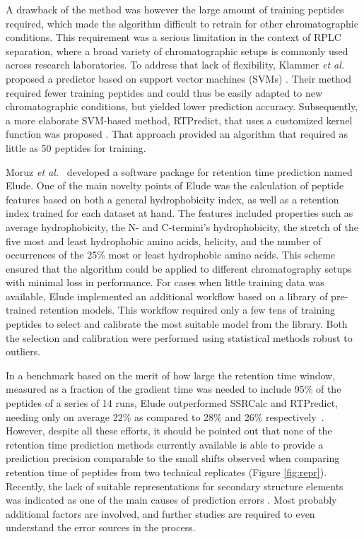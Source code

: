 \documentclass[a4paper]{article}
\begin{document}
A drawback of the method was however the large amount of training
peptides required, which made the algorithm difficult to retrain for
other chromatographic conditions. This requirement was a serious
limitation in the context of RPLC separation, where a broad variety of
chromatographic setups is commonly used across research
laboratories. To address that lack of flexibility, Klammer {\em et
  al.} proposed a predictor based on support vector machines (SVMs)
\cite{klammer2007improving}. Their method required fewer training
peptides and could thus be easily adapted to new chromatographic
conditions, but yielded lower prediction accuracy.  Subsequently, a
more elaborate SVM-based method, {\sc RTPredict}, that uses a
customized kernel function was proposed \cite{rtpredict,
  rtpredictImproved}. That approach provided an algorithm that
required as little as 50 peptides for training.


Moruz {\em et al.}~\cite{elude1} developed a software package for
retention time prediction named {\sc Elude}. One of the main novelty
points of {\sc Elude} was the calculation of peptide features based on
both a general hydrophobicity index, as well as a retention index
trained for each dataset at hand. The features included properties
such as average hydrophobicity, the N- and C-termini's hydrophobicity,
the stretch of the five most and least hydrophobic amino acids,
helicity, and the number of occurrences of the 25\% most or least
hydrophobic amino acids. This scheme ensured that the algorithm could
be applied to different chromatography setups with minimal loss in
performance. For cases when little training data was available, {\sc
  Elude} implemented an additional workflow based on a library of
pre-trained retention models. This workflow required only a few tens
of training peptides to select and calibrate the most suitable model
from the library. Both the selection and calibration were performed
using statistical methods robust to outliers.


In a benchmark based on the merit of how large the retention time
window, measured as a fraction of the gradient time was needed to
include 95\% of the peptides of a series of 14 runs, {\sc Elude}
outperformed {\sc SSRCalc} and {\sc RTPredict}, needing only on
average 22\% as compared to 28\% and 26\%
respectively~\cite{elude1}. However, despite all these efforts, it
should be pointed out that none of the retention time prediction
methods currently available is able to provide a prediction precision
comparable to the small shifts observed when comparing retention time
of peptides from two technical replicates (Figure
\ref{fig:repr}). Recently, the lack of suitable representations for
secondary structure elements was indicated as one of the main causes
of prediction errors \cite{Reimer2012}.  Most probably additional
factors are involved, and further studies are required to even
understand the error sources in the process.
\end{document}
